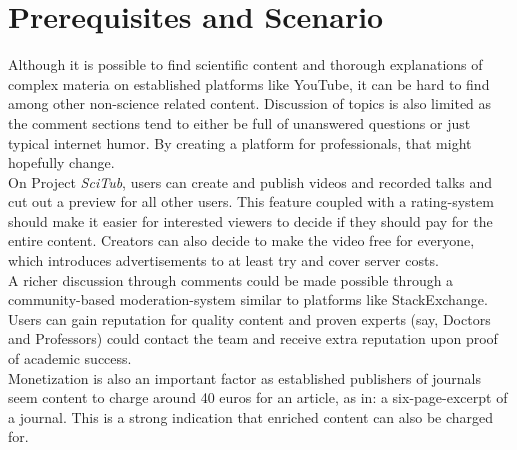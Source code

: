 \section{Prerequisites and Scenario}\label{sec:ch1}

Although it is possible to find scientific content and thorough explanations
of complex materia on established platforms like YouTube, it can be
hard to find among other non-science related content. Discussion of topics 
is also limited as the comment sections tend to either be full of unanswered questions
or just typical internet humor. By creating a platform for professionals,
that might hopefully change.\\
On Project \textit{SciTub}, users can create and publish videos and recorded 
talks and cut out a preview for all other
users. This feature coupled with a rating-system should make it easier 
for interested viewers to decide if they should pay for the entire content.
Creators can also decide to make the video free for everyone, which 
introduces advertisements to at least try and cover server costs.\\
A richer discussion through comments could be made possible through a 
community-based moderation-system similar to platforms like StackExchange.
Users can gain reputation for quality content and proven experts
(say, Doctors and Professors) could contact the team and receive extra reputation
upon proof of academic success.\\
Monetization is also an important factor as established publishers of journals
seem content to charge around 40 euros for an article, as in: a six-page-excerpt of a journal.
This is a strong indication that enriched content can also be charged for.\\

